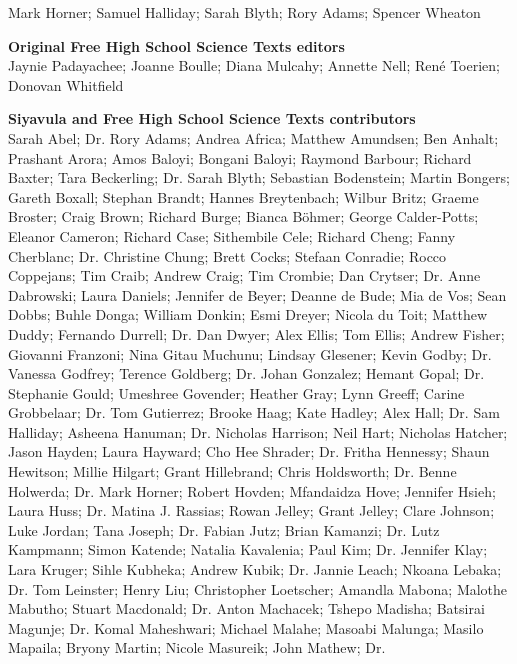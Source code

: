 Mark Horner; Samuel Halliday; Sarah Blyth; Rory Adams; Spencer Wheaton \par 


\textbf{\LARGE Original Free High School Science Texts editors}\\

Jaynie Padayachee; Joanne Boulle; Diana Mulcahy; Annette Nell; René Toerien; Donovan Whitfield \par

\textbf{\LARGE Siyavula and Free High School Science Texts contributors}\\

Sarah Abel; Dr. Rory Adams; Andrea Africa; Matthew Amundsen; Ben Anhalt; Prashant Arora; Amos Baloyi; Bongani
Baloyi; Raymond Barbour; Richard Baxter; Tara Beckerling; Dr. Sarah Blyth; Sebastian Bodenstein; Martin Bongers;
Gareth Boxall; Stephan Brandt; Hannes Breytenbach; Wilbur Britz; Graeme Broster; Craig Brown; Richard Burge;
Bianca Böhmer; George Calder-Potts; Eleanor Cameron; Richard Case; Sithembile Cele; Richard Cheng; Fanny
Cherblanc; Dr. Christine Chung; Brett Cocks; Stefaan Conradie; Rocco Coppejans; Tim Craib; Andrew Craig; Tim
Crombie; Dan Crytser; Dr. Anne Dabrowski; Laura Daniels; Jennifer de Beyer; Deanne de Bude; Mia de Vos; Sean
Dobbs; Buhle Donga; William Donkin; Esmi Dreyer; Nicola du Toit; Matthew Duddy; Fernando Durrell; Dr. Dan
Dwyer; Alex Ellis; Tom Ellis; Andrew Fisher; Giovanni Franzoni; Nina Gitau Muchunu; Lindsay Glesener; Kevin
Godby; Dr. Vanessa Godfrey; Terence Goldberg; Dr. Johan Gonzalez; Hemant Gopal; Dr. Stephanie Gould; Umeshree
Govender; Heather Gray; Lynn Greeff; Carine Grobbelaar; Dr. Tom Gutierrez; Brooke Haag; Kate Hadley; Alex Hall;
Dr. Sam Halliday; Asheena Hanuman; Dr. Nicholas Harrison; Neil Hart; Nicholas Hatcher; Jason Hayden; Laura
Hayward; Cho Hee Shrader; Dr. Fritha Hennessy; Shaun Hewitson; Millie Hilgart; Grant Hillebrand; Chris Holdsworth;
Dr. Benne Holwerda; Dr. Mark Horner; Robert Hovden; Mfandaidza Hove; Jennifer Hsieh; Laura Huss; Dr. Matina J.
Rassias; Rowan Jelley; Grant Jelley; Clare Johnson; Luke Jordan; Tana Joseph; Dr. Fabian Jutz; Brian Kamanzi; Dr.
Lutz Kampmann; Simon Katende; Natalia Kavalenia; Paul Kim; Dr. Jennifer Klay; Lara Kruger; Sihle Kubheka;
Andrew Kubik; Dr. Jannie Leach; Nkoana Lebaka; Dr. Tom Leinster; Henry Liu; Christopher Loetscher; Amandla
Mabona; Malothe Mabutho; Stuart Macdonald; Dr. Anton Machacek; Tshepo Madisha; Batsirai Magunje; Dr. Komal
Maheshwari; Michael Malahe; Masoabi Malunga; Masilo Mapaila; Bryony Martin; Nicole Masureik; John Mathew; Dr.
